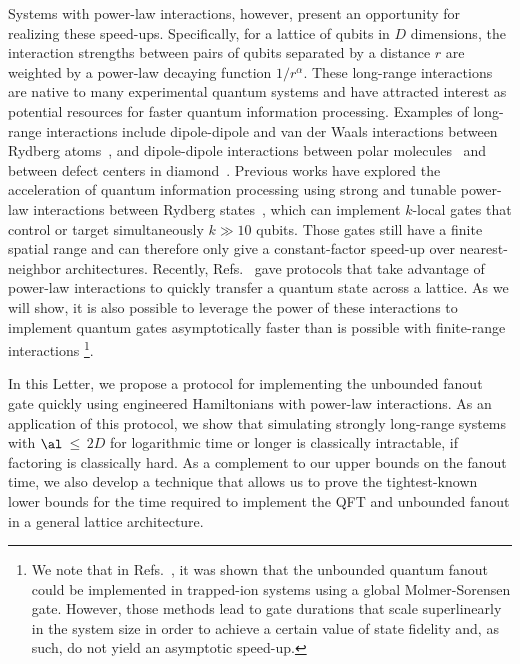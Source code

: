 Systems with power-law interactions, however, present an opportunity for realizing these speed-ups.
Specifically, for a lattice of qubits in $D$ dimensions, the interaction strengths between pairs of qubits separated by a distance $r$ are weighted by a power-law decaying function $1/r^\alpha$.
These long-range interactions are native to many experimental quantum systems and have attracted interest as potential resources for faster quantum information processing. Examples of long-range interactions include dipole-dipole and van der Waals interactions between Rydberg atoms~\cite{Saffman2010,Weimer2012}, and dipole-dipole interactions between polar molecules~\cite{Yan2013} and between defect centers in diamond~\cite{Yao2012,Weimer2012}.
Previous works have explored the acceleration of quantum information processing using strong and tunable power-law interactions between Rydberg states~\cite{Isenhower2011,Molmer2011,Petrosyan2017,Gulliksen2015,Muller2009,Young2020,Levine2019}, which can implement $k$-local gates that control or target simultaneously $k \gg 10$ qubits.
Those gates still have a finite spatial range and can therefore only give a constant-factor speed-up over nearest-neighbor architectures.
Recently, Refs.~\cite{Eldredge2017,Guo2020,Tran2020hierarchylinearlightcones,kuwaharaStrictlyLinearLight2020} gave protocols that take advantage of power-law interactions to quickly transfer a quantum state across a lattice.
As we will show, it is also possible to leverage the power of these interactions to implement quantum gates asymptotically faster than is possible with finite-range interactions \footnote{We note that in Refs.~\cite{Maslov2018,Lu2019}, it was shown that the unbounded quantum fanout could be implemented in trapped-ion systems using a global Molmer-Sorensen gate.
    However, those methods lead to gate durations that scale superlinearly in the system size in order to achieve a certain value of state fidelity and, as such, do not yield an asymptotic speed-up.}.

In this Letter, we propose a protocol for implementing the unbounded fanout gate quickly using engineered Hamiltonians with power-law interactions.
As an application of this protocol, we show that simulating strongly long-range systems with $\al$\,$\le$\,$2D$ for logarithmic time or longer is classically intractable, if factoring is classically hard.
As a complement to our upper bounds on the fanout time, we also develop a technique that allows us to prove the tightest-known lower bounds for the time required to implement the QFT and unbounded fanout in a general lattice architecture.

